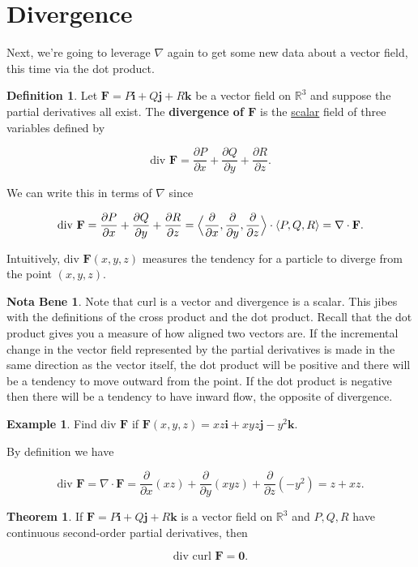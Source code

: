 \documentclass[11pt,oneside,english]{amsart}
\theoremstyle{definition}
\newtheorem{theorem}{Theorem}
\newtheorem*{example}{Example}
\newtheorem*{definition}{Definition}
\newtheorem*{note}{Nota Bene}
\newcommand{\R}{\mathbb{R}}
\newcommand{\pp}[2]{\frac{\partial{#1}}{\partial{#2}}}
\def\<#1>{\mathinner{\langle#1\rangle}}
\begin{document}
\pagebreak

\section*{Divergence}

Next, we're going to leverage $\nabla $ again to get some new data about a vector field, this time via the dot product.

\begin{definition}
Let $\mathbf{F}=P\mathbf{i}+Q\mathbf{j}+R\mathbf{k}$ be a vector field on $\R^3$ and suppose the partial derivatives all exist. The \textbf{divergence of $\mathbf{F}$} is the \uline{scalar} field of three variables defined by 

\[
\text{div }\mathbf{F}=\pp{P}{x}+\pp{Q}{y}+\pp{R}{z}.
\]

We can write this in terms of $\nabla$ since 

\[
\text{div }\mathbf{F}=\pp{P}{x}+\pp{Q}{y}+\pp{R}{z}=\Bigl<\pp{}{x},\pp{}{y},\pp{}{z}\Bigr>\cdot\<P,Q,R>=\nabla\cdot\mathbf{F}.
\]

Intuitively, div $\mathbf{F}(x,y,z)$ measures the tendency for a particle to diverge from the point $(x,y,z)$.
\end{definition}

\begin{note}
Note that curl is a vector and divergence is a scalar. This jibes with the definitions of the cross product and the dot product. Recall that the dot product gives you a measure of how aligned two vectors are. If the incremental change in the vector field represented by the partial derivatives is made in the same direction as the vector itself, the dot product will be positive and there will be a tendency to move outward from the point. If the dot product is negative then there will be a tendency to have inward flow, the opposite of divergence.
\end{note}

\begin{example}
Find div $\mathbf{F}$ if $\mathbf{F}(x,y,z)=xz\mathbf{i}+xyz\mathbf{j}-y^2\mathbf{k}$.

By definition we have

\[
\text{div }\mathbf{F}=\nabla \cdot \mathbf{F}=\pp{}{x}(xz)+\pp{}{y}(xyz)+\pp{}{z}(-y^2)=z+xz.
\]
\end{example}

\begin{theorem}
If $\mathbf{F}=P\mathbf{i}+Q\mathbf{j}+R\mathbf{k}$ is a vector field on $\R^3$ and $P,Q,R$ have continuous second-order partial derivatives, then

\[
\text{div curl }\mathbf{F}=\mathbf{0}.
\]
\end{theorem}
\end{document}
